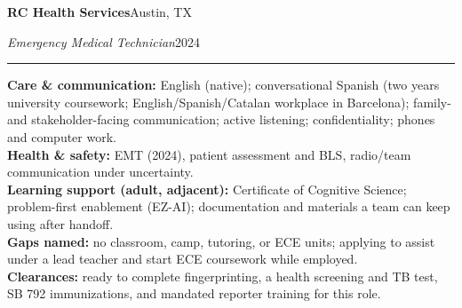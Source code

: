 \documentclass[10pt,letterpaper]{article}
\newcommand{\cvsection}[1]{%
  \vspace{7pt}%
  \noindent{\bfseries\fontsize{11pt}{13pt}\selectfont\MakeUppercase{#1}}\par
  \vspace{1pt}%
  \noindent\rule{\textwidth}{0.4pt}\par
  \vspace{4pt}%
}
\newcommand{\cveduhead}[4]{%
  \noindent\textbf{#1}\hfill#2\par
  \vspace{0.5pt}%
  \noindent\textit{#3}\hfill#4\par
}
\begin{document}
\vspace{3pt}
\cveduhead{RC Health Services}{Austin, TX}
{Emergency Medical Technician}{2024}

\cvsection{Skills}

{\raggedright
\noindent\textbf{Care \& communication:} English (native); conversational Spanish (two years university coursework; English/Spanish/Catalan workplace in Barcelona); family- and stakeholder-facing communication; active listening; confidentiality; phones and computer work.\\[2pt]
\noindent\textbf{Health \& safety:} EMT (2024), patient assessment and BLS, radio/team communication under uncertainty.\\[2pt]
\noindent\textbf{Learning support (adult, adjacent):} Certificate of Cognitive Science; problem-first enablement (EZ-AI); documentation and materials a team can keep using after handoff.\\[2pt]
\noindent\textbf{Gaps named:} no classroom, camp, tutoring, or ECE units; applying to assist under a lead teacher and start ECE coursework while employed.\\[2pt]
\noindent\textbf{Clearances:} ready to complete fingerprinting, a health screening and TB test, SB 792 immunizations, and mandated reporter training for this role.\par
}
\end{document}
